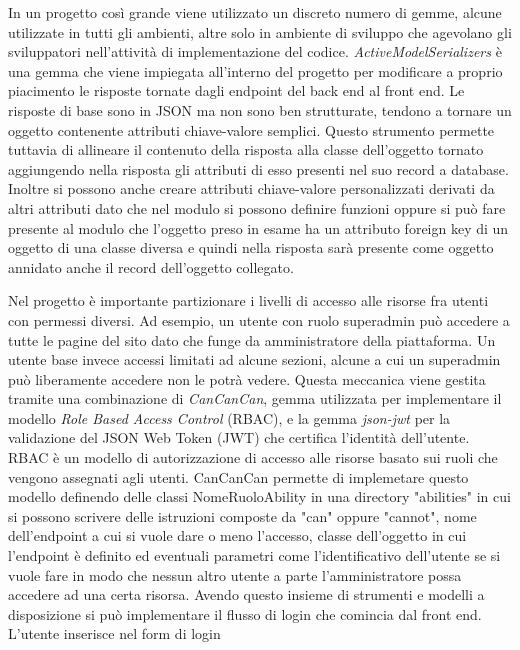 \documentclass[target=bach,aauheader=,style=]{thud}
\begin{document}
In un progetto così grande viene utilizzato un discreto numero di gemme, alcune utilizzate in tutti gli ambienti, altre solo in ambiente
di sviluppo che agevolano gli sviluppatori nell'attività di implementazione del codice.
\textit{ActiveModelSerializers}\cite{active_model_serializers_gem} è una gemma che viene impiegata all'interno del progetto per modificare a proprio
piacimento le risposte tornate dagli endpoint del back end al front end. Le risposte di base sono in JSON ma non sono ben strutturate, tendono a tornare un oggetto
contenente attributi chiave-valore semplici. Questo strumento permette tuttavia di allineare il contenuto della risposta alla classe dell'oggetto tornato aggiungendo
nella risposta gli attributi di esso presenti nel suo record a database. Inoltre si possono anche creare attributi chiave-valore personalizzati derivati da altri
attributi dato che nel modulo si possono definire funzioni oppure si può fare presente al modulo che l'oggetto preso in esame ha un attributo foreign key di un
oggetto di una classe diversa e quindi nella risposta sarà presente come oggetto annidato anche il record dell'oggetto collegato.
\par Nel progetto è importante partizionare i livelli di accesso alle risorse fra utenti con permessi diversi. Ad esempio, un utente con ruolo superadmin può accedere
a tutte le pagine del sito dato che funge da amministratore della piattaforma. Un utente base invece accessi limitati ad alcune sezioni, alcune a cui
un superadmin può liberamente accedere non le potrà vedere. Questa meccanica viene gestita tramite una combinazione di \textit{CanCanCan}\cite{cancancan_gem}, gemma utilizzata per implementare
il modello \textit{Role Based Access Control} (RBAC)\cite{ibm_rbac}, e la gemma \textit{json-jwt}\cite{json_jwt_gem} per la validazione del JSON Web Token (JWT) che
certifica l'identità dell'utente. RBAC è un modello di autorizzazione di accesso alle risorse basato sui ruoli che vengono assegnati agli utenti.
CanCanCan permette di implemetare questo modello definendo delle classi NomeRuoloAbility in una directory "abilities" in cui si possono scrivere delle
istruzioni composte da "can" oppure "cannot", nome dell'endpoint a cui si vuole dare o meno l'accesso, classe dell'oggetto in cui l'endpoint è definito ed eventuali
parametri come l'identificativo dell'utente se si vuole fare in modo che nessun altro utente a parte l'amministratore possa accedere ad una certa risorsa. 
Avendo questo insieme di strumenti e modelli a disposizione si può implementare il flusso di login che comincia dal front end. L'utente inserisce nel form di login
\end{document}
